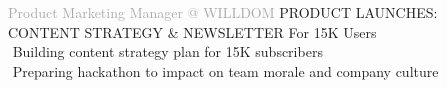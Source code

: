 \begin{cvtable}
{\textcolor{darkgray}{%
    Product Marketing Manager
    \newline @
{W\scriptsize ILL}{D\scriptsize OM}
    }}%
{
}%
{%
{\scriptsize PRODUCT LAUNCHES:
CONTENT STRATEGY
\&
NEWSLETTER
For %
15K Users
} \\
    \textperiodcentered $ $ Building content strategy plan
    for 15K subscribers \\
    \textperiodcentered $ $ Preparing hackathon to impact on team morale and company culture \\
} 


\end{cvtable}
